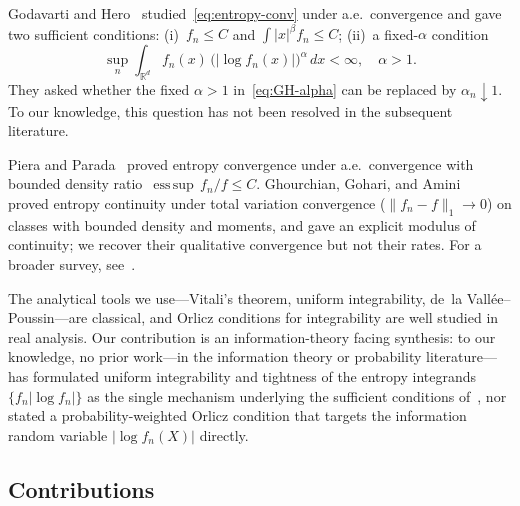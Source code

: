 \documentclass[journal]{IEEEtran}
\theoremstyle{definition}
\theoremstyle{remark}
\newcommand{\Rd}{\mathbb{R}^d}
\newcommand{\1}{\mathbf{1}}
\newcommand{\abs}[1]{\lvert #1 \rvert}
\newcommand{\norm}[1]{\lVert #1 \rVert}
\newcommand{\dx}{\,dx}
\DeclareMathOperator*{\esssup}{ess\,sup}
\begin{document}
Godavarti and Hero~\cite{GodavartiHero2004}
studied~\eqref{eq:entropy-conv} under a.e.\ convergence and gave
two sufficient conditions:
(i)~$f_n \leq C$ and $\int \abs{x}^\beta f_n \leq C$;
(ii)~a fixed-$\alpha$ condition
\begin{equation}\label{eq:GH-alpha}
  \sup_n \int_{\Rd} f_n(x)\,
  \bigl(\abs{\log f_n(x)}\bigr)^\alpha \dx < \infty,
  \quad \alpha > 1.
\end{equation}
They asked whether the fixed $\alpha > 1$
in~\eqref{eq:GH-alpha} can be replaced by $\alpha_n \downarrow 1$.
To our knowledge, this question has not been resolved in the
subsequent literature.

Piera and Parada~\cite{PieraParada2009} proved entropy convergence
under a.e.\ convergence with bounded density
ratio~$\esssup\, f_n/f \leq C$.
Ghourchian, Gohari, and Amini~\cite{GhourchianGohariAmini2017}
proved entropy continuity under total variation convergence
($\norm{f_n - f}_1 \to 0$) on classes with bounded density and
moments, and gave an explicit modulus of continuity;
we recover their qualitative convergence but not their rates.
For a broader survey, see~\cite{Verdu2019}.

The analytical tools we use---Vitali's theorem, uniform
integrability, de~la Vall\'{e}e--Poussin---are classical, and
Orlicz conditions for integrability are well studied in
real analysis.
Our contribution is an information-theory facing synthesis:
to our knowledge, no prior work---in the information theory
or probability literature---has formulated uniform integrability
and tightness of the entropy integrands
$\{f_n\abs{\log f_n}\}$ as the single mechanism underlying the
sufficient conditions
of~\cite{GodavartiHero2004, PieraParada2009,
GhourchianGohariAmini2017}, nor
stated a probability-weighted Orlicz condition that targets the
information random variable $\abs{\log f_n(X)}$ directly.

\subsection*{Contributions}
\end{document}
